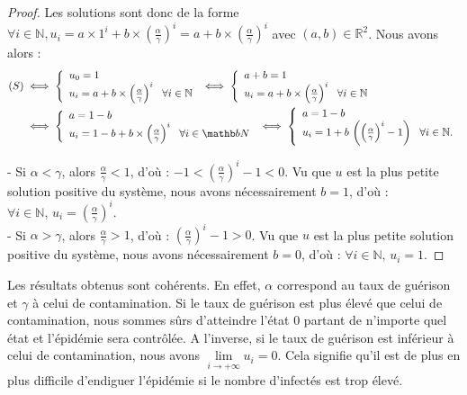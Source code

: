 \documentclass[12pt,a4paper]{report}
\theoremstyle{remark}
\begin{document}
\begin{proof}
Les solutions sont donc de la forme $\forall i \in \mathbb {N}, u_i = a \times 1^i + b \times (\frac{\alpha}{\gamma})^i = a+b\times (\frac{\alpha}{\gamma})^i$ avec $(a,b) \in \mathbb{R}^2$. Nous avons alors :
\\
\begin{align*}
(S) &\iff \left\{
\begin{array}{ll}
        u_0=1\\
        u_i=a+b\times \left(\frac{\alpha}{\gamma}\right)^i  \ \ \forall i \in \mathbb{N}
    \end{array}
\right. 
\iff \left\{
\begin{array}{ll}
        a+b=1\\
        u_i=a+b\times \left(\frac{\alpha}{\gamma}\right)^i \ \ \forall i \in \mathbb{N}
    \end{array}
\right. \\
&\iff \left\{
\begin{array}{ll}
        a=1-b\\
        u_i=1-b+b\times \left(\frac{\alpha}{\gamma}\right)^i \ \ \forall i \in \mathb
        b{N}
    \end{array}
\right.
\iff \left\{
\begin{array}{ll}
        a=1-b\\
        u_i=1+b \, \left(\left(\frac{\alpha}{\gamma}\right)^i - 1\right)\ \ \forall i \in \mathbb{N}.
    \end{array}
\right.
\end{align*}

- Si $\alpha < \gamma$, alors $\frac{\alpha}{\gamma} < 1$, d'où : $-1 < \left(\frac{\alpha}{\gamma}\right)^i - 1 < 0$. Vu que $u$ est la plus petite solution positive du système, nous avons nécessairement $b = 1$, d'où : $\forall i \in \mathbb{N}, \, u_i = \left(\frac{\alpha}{\gamma}\right)^i$.\\

- Si $\alpha > \gamma$, alors $\frac{\alpha}{\gamma} > 1$, d'où : $\left(\frac{\alpha}{\gamma}\right)^i - 1 > 0$. Vu que $u$ est la plus petite solution positive du système, nous avons nécessairement $b = 0$, d'où : $\forall i \in \mathbb{N}, \, u_i =1$.
\end{proof}

Les résultats obtenus sont cohérents. En effet, $\alpha$ correspond au taux de guérison et $\gamma$ à celui de contamination. Si le taux de guérison est plus élevé que celui de contamination, nous sommes sûrs d'atteindre l'état $0$ partant de n'importe quel état et l'épidémie sera contrôlée. A l'inverse, si le taux de guérison est inférieur à celui de contamination, nous avons $\lim\limits_{i \to +\infty} u_i = 0$. Cela signifie qu'il est de plus en plus difficile d'endiguer l'épidémie si le nombre d'infectés est trop élevé.
\\
\end{document}
